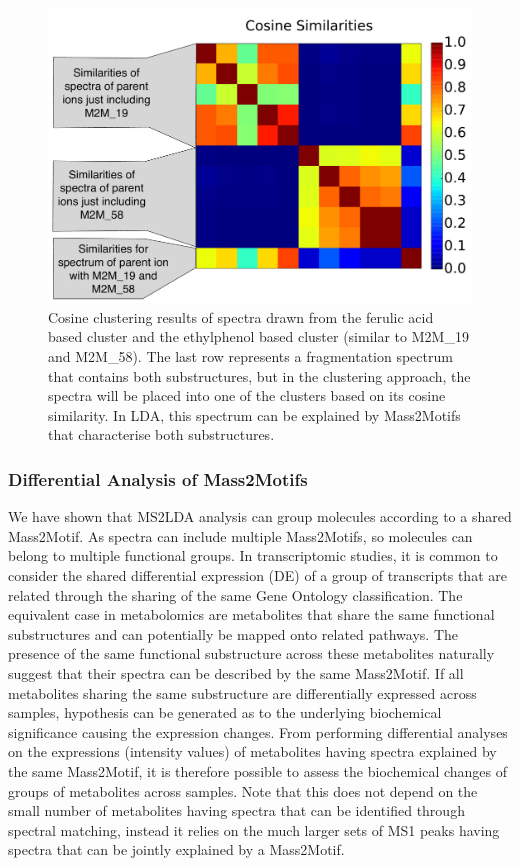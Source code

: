 \begin{figure}[!htbp]
\centering\includegraphics[width=0.6\linewidth]{07-lda/figures/figure10.pdf}
\centering\caption[Cosine clustering results of spectra drawn from the ferulic acid based cluster and the ethylphenol based cluster (similar to M2M{\_}19 and M2M{\_}58). ]{Cosine clustering results of spectra drawn from the ferulic acid based cluster and the ethylphenol based cluster (similar to M2M{\_}19 and M2M{\_}58). The last row represents a fragmentation spectrum that contains both substructures, but in the clustering approach, the spectra will be placed into one of the clusters based on its cosine similarity. In LDA, this spectrum can be explained by Mass2Motifs that characterise both substructures.\label{fig:m2lda-cosine-clustering}}
\end{figure}

\subsubsection{Differential Analysis of Mass2Motifs}

We have shown that MS2LDA analysis can group molecules according to a shared Mass2Motif. As spectra can include multiple Mass2Motifs, so molecules can belong to multiple functional groups. In transcriptomic studies, it is common to consider the shared differential expression (DE) of a group of transcripts that are related through the sharing of the same Gene Ontology classification. The equivalent case in metabolomics are metabolites that share the same functional substructures and can potentially be mapped onto related pathways. The presence of the same functional substructure across these metabolites naturally suggest that their spectra can be described by the same Mass2Motif. If all metabolites sharing the same substructure are differentially expressed across samples, hypothesis can be generated as to the underlying biochemical significance causing the expression changes. From performing differential analyses on the expressions (intensity values) of metabolites having spectra explained by the same Mass2Motif, it is therefore possible to assess the biochemical changes of groups of metabolites across samples. Note that this does not depend on the small number of metabolites having spectra that can be identified through spectral matching, instead it relies on the much larger sets of MS1 peaks having spectra that can be jointly explained by a Mass2Motif.

